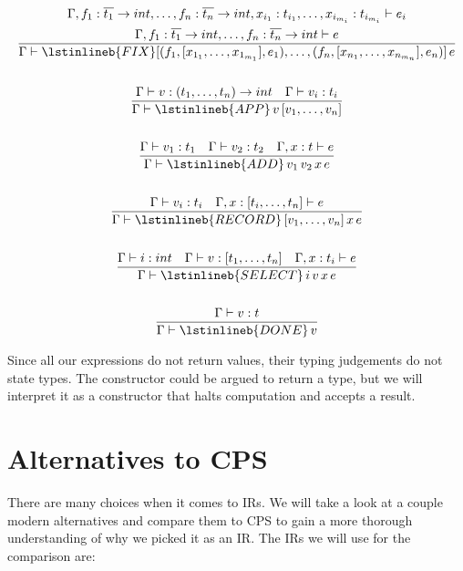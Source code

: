 \begin{gather*}
\Gamma, f_1 : \overline{t_1} \to int, \dots, f_n : \overline{t_n} \to int, x_{i_1} : t_{i_1}, \dots, x_{i_{m_i}} : t_{i_{m_i}} \vdash e_i \\
\frac{\Gamma, f_1 : \overline{t_1} \to int, \dots, f_n : \overline{t_n} \to int \vdash e}{\Gamma \vdash \lstinlineb{FIX} [(f_1, [x_{1_1}, \dots, x_{1_{m_1}}], e_1), \dots, (f_n, [x_{n_1}, \dots, x_{n_{m_n}}], e_n)] \, e} \\ \\
\frac{\Gamma \vdash v : (t_1, \dots, t_n) \to int \quad \Gamma \vdash v_i : t_i}{\Gamma \vdash \lstinlineb{APP} \, v \, [v_1, \dots, v_n]} \\ \\
\frac{\Gamma \vdash v_1 : t_1 \quad \Gamma \vdash v_2 : t_2 \quad \Gamma, x : t \vdash e}{\Gamma \vdash \lstinlineb{ADD} \, v_1 \, v_2 \, x \, e} \\ \\
\frac{\Gamma \vdash v_i : t_i \quad \Gamma, x : [t_i, \dots, t_n] \vdash e}{\Gamma \vdash \lstinlineb{RECORD} \, [v_1, \dots, v_n] \, x \, e} \\ \\
\frac{\Gamma \vdash i : int \quad \Gamma \vdash v : [t_1, \dots, t_n] \quad \Gamma, x : t_i \vdash e}{\Gamma \vdash \lstinlineb{SELECT} \, i \, v \, x \, e} \\ \\
\frac{\Gamma \vdash v : t}{\Gamma \vdash \lstinlineb{DONE} \, v}
\end{gather*}

Since all our expressions do not return values, their typing judgements do not state types. The  constructor could be argued to return a type, but we will interpret it as a constructor that halts computation and accepts a result.


\section{\label{section:cpscomp}Alternatives to CPS}
There are many choices when it comes to \acp{IR}. We will take a look at a couple modern alternatives and compare them to \ac{CPS} to gain a more thorough understanding of why we picked it as an \ac{IR}. The \acp{IR} we will use for the comparison are:

